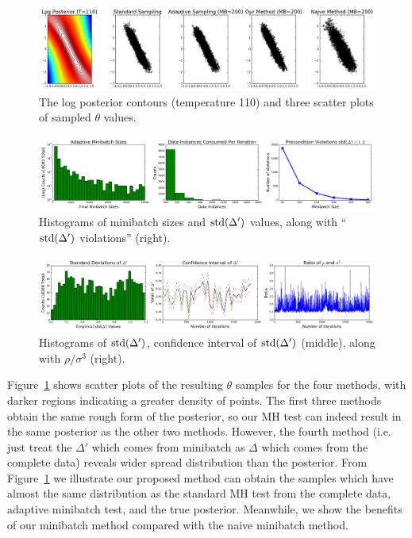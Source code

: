 \documentclass{article}
\begin{document}
\begin{figure}[t]
    \centering
    \includegraphics[width=1\linewidth]{cloud_v01.png}
    \caption{
    The log posterior contours (temperature 110) and three scatter plots of sampled $\theta$ values.
    }
    \label{fig:gauss_mix_1}
\end{figure}

\begin{figure}[t]
    \centering
    \includegraphics[width=1\linewidth]{adaptive_and_ours_information_v01.png}
    \caption{
    Histograms of minibatch sizes and ${\rm std}(\Delta')$ values, along with ``${\rm std}(\Delta')$
    violations'' (right).
    }
    \label{fig:gauss_mix_2}
\end{figure}

\begin{figure}[t]
    \centering
    \includegraphics[width=1\linewidth]{CI_v01.png}
    \caption{
    Histograms of ${\rm std}(\Delta')$, confidence interval of ${\rm std}(\Delta')$ (middle), along with $\rho / \sigma^3$ (right).
    }
    \label{fig:gauss_mix_3}
\end{figure}

Figure~\ref{fig:gauss_mix_1} shows scatter plots of the resulting $\theta$ samples for the four
methods, with darker regions indicating a greater density of points. The first three methods obtain the
same rough form of the posterior, so our MH test can indeed result in the same posterior as the
other two methods. However, the fourth method (i.e. just treat the $\Delta'$ which comes from minibatch as $\Delta$ which comes from the complete data) reveals wider spread distribution than the posterior. From Figure~\ref{fig:gauss_mix_1} we illustrate our proposed method can obtain the samples which have almost the same distribution as the standard MH test from the complete data, adaptive minibatch test, and the true posterior. Meanwhile, we show the benefits of our minibatch method compared with the naive minibatch method.  
\end{document}
